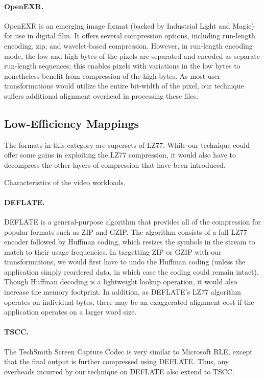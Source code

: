 \paragraph{OpenEXR.}
OpenEXR is an emerging image format (backed by Industrial Light and
Magic) for use in digital film.  It offers several compression
options, including run-length encoding, zip, and wavelet-based
compression.  However, in run-length encoding mode, the low and high
bytes of the pixels are separated and encoded as separate run-length
sequences; this enables pixels with variations in the low bytes to
nonetheless benefit from compression of the high bytes.  As most user
transformations would utilize the entire bit-width of the pixel, our
technique suffers additional alignment overhead in processing these
files.

\subsection{Low-Efficiency Mappings}
\label{sec:formats-bad}

The formats in this category are supersets of LZ77.  While our
technique could offer some gains in exploiting the LZ77 compression,
it would also have to decompress the other layers of compression that
have been introduced.

\begin{table*}[t]
\caption{Characteristics of the video workloads.
\protect\label{tab:videos}}
\end{table*}

\paragraph{DEFLATE.}
DEFLATE is a general-purpose algorithm that provides all of the
compression for popular formats such as ZIP and GZIP.  The algorithm
consists of a full LZ77 encoder followed by Huffman coding, which
resizes the symbols in the stream to match to their usage frequencies.
In targetting ZIP or GZIP with our transformations, we would first
have to undo the Huffman coding (unless the application simply
reordered data, in which case the coding could remain intact).  Though
Huffman decoding is a lightweight lookup operation, it would also
increase the memory footprint.  In addition, as DEFLATE's LZ77
algorithm operates on individual bytes, there may be an exaggerated
alignment cost if the application operates on a larger word size.

\paragraph{TSCC.}
The TechSmith Screen Capture Codec is very similar to Microsoft RLE,
except that the final output is further compressed using DEFLATE.
Thus, any overheads incurred by our technique on DEFLATE also extend
to TSCC.


